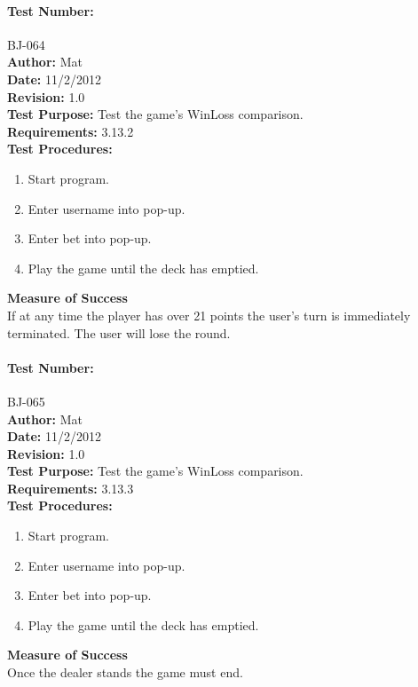 \documentclass{article}
\begin{document}
\paragraph{Test Number:} BJ-064\\
\textbf{Author:} Mat\\
\textbf{Date:} 11/2/2012\\
\textbf{Revision:} 1.0\\
\textbf{Test Purpose:} Test the game's WinLoss comparison.\\
\textbf{Requirements:} 3.13.2 \\
\textbf{Test Procedures:} 
\begin{enumerate}
\item Start program.
\item Enter username into pop-up.
\item Enter bet into pop-up.
\item Play the game until the deck has emptied.
\end{enumerate}
\textbf{Measure of Success}\\If at any time the player has over 21 points the user's turn is immediately terminated.  The user will lose the round.
\paragraph{Test Number:} BJ-065\\
\textbf{Author:} Mat\\
\textbf{Date:} 11/2/2012\\
\textbf{Revision:} 1.0\\
\textbf{Test Purpose:} Test the game's WinLoss comparison.\\
\textbf{Requirements:} 3.13.3 \\
\textbf{Test Procedures:} 
\begin{enumerate}
\item Start program.
\item Enter username into pop-up.
\item Enter bet into pop-up.
\item Play the game until the deck has emptied.
\end{enumerate}
\textbf{Measure of Success}\\Once the dealer stands the game must end.
\end{document}
